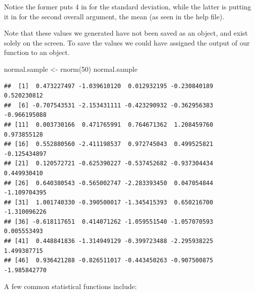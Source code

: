 \documentclass[
]{book}
\newenvironment{Shaded}{\begin{snugshade}}{\end{snugshade}}
\newcommand{\DecValTok}[1]{\textcolor[rgb]{0.00,0.00,0.81}{#1}}
\newcommand{\FunctionTok}[1]{\textcolor[rgb]{0.00,0.00,0.00}{#1}}
\newcommand{\NormalTok}[1]{#1}
\newcommand{\OtherTok}[1]{\textcolor[rgb]{0.56,0.35,0.01}{#1}}
\begin{document}
Notice the former puts 4 in for the standard deviation, while the latter is putting it in for the second overall argument, the mean (as seen in the help file).

Note that these values we generated have not been saved as an object, and exist solely on the screen. To save the values we could have assigned the output of our function to an object.

\begin{Shaded}
\begin{Highlighting}[]
\NormalTok{normal.sample }\OtherTok{\textless{}{-}} \FunctionTok{rnorm}\NormalTok{(}\DecValTok{50}\NormalTok{)}
\NormalTok{normal.sample}
\end{Highlighting}
\end{Shaded}

\begin{verbatim}
##  [1]  0.473227497 -1.039610120  0.012932195 -0.230840189  0.520230812
##  [6] -0.707543531 -2.153431111 -0.423290932 -0.362956383 -0.966195088
## [11]  0.003730166  0.471765991  0.764671362  1.208459760  0.973855128
## [16]  0.552880560 -2.411198537  0.972745043  0.499525821 -0.125434897
## [21]  0.120572721 -0.625390227 -0.537452682 -0.937304434  0.449930410
## [26]  0.640380543 -0.565002747 -2.283393450  0.047054844 -1.109704395
## [31]  1.001740330 -0.390500017 -1.345415393  0.650216700 -1.310096226
## [36] -0.618117651  0.414071262 -1.059551540 -1.057070593  0.005553493
## [41]  0.448841836 -1.314949129 -0.399723488 -2.295938225  1.499387715
## [46]  0.936421288 -0.826511017 -0.443450263 -0.907500875 -1.985842770
\end{verbatim}

A few common statistical functions include:
\end{document}
